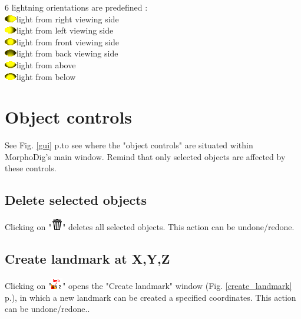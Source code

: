 6 lightning orientations are predefined :\\
\includegraphics[scale=0.7]{images/06/light/light_right.png}light from right viewing side\\
\includegraphics[scale=0.7]{images/06/light/light_left.png}light from left viewing side\\
\includegraphics[scale=0.7]{images/06/light/light_front.png}light from front viewing side\\
\includegraphics[scale=0.7]{images/06/light/light_back.png}light from back viewing side\\
\includegraphics[scale=0.7]{images/06/light/light_above.png}light from above\\
\includegraphics[scale=0.7]{images/06/light/light_below.png}light from below\\




  \section{Object controls}
See Fig. \ref{gui} p.\pageref{gui}to see where the "object controls" are situated within MorphoDig's main window. Remind that only selected objects are affected by these controls.

\subsection{Delete selected objects}
Clicking on "\includegraphics[scale=0.7]{images/06/objects/delete2.png}" deletes all selected objects. This action can be undone/redone.

\subsection{Create landmark at X,Y,Z}
Clicking on "\includegraphics[scale=0.7]{images/06/objects/landmark_xyz.png}" opens the "Create landmark" window  (Fig. \ref{create_landmark} p.\pageref{create_landmark}), in which a new landmark can be created a specified coordinates. This action can be undone/redone..

